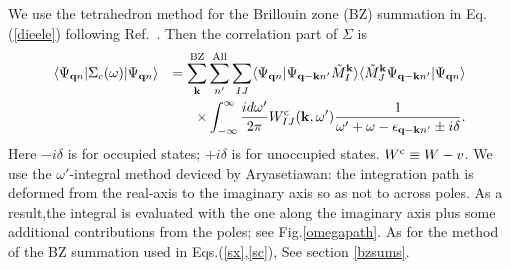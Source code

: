 \documentclass[a4paper,10pt,epsf,fleqn]{article}
\begin{document}
We use the tetrahedron method for the Brillouin zone (BZ) summation in Eq.(\ref{dieele})
following Ref.~\cite{rath75}.
Then the correlation part of $\Sigma$ is
\begin{eqnarray}
\langle \Psi_{{\bf q}n}|\Sigma_{\rm c}(\omega) |\Psi_{{\bf q}n} \rangle
&& = \sum^{\rm BZ}_{\bf k}  \sum^{\rm  All}_{n'} \sum_{IJ}
\langle \Psi_{{\bf q}n}| \Psi_{{\bf q-k}n'} \tilde{M}^{\bf k}_I \rangle
\langle \tilde{M}^{\bf k}_J \Psi_{{\bf q-k}n'} | \Psi_{{\bf q}n} \rangle  \nonumber \\
&& \times \int_{-\infty}^{\infty} \frac{i d\omega'}{2 \pi}
W^{\rm c}_{IJ}({\bf k},\omega')
\frac{1}{\omega'+\omega-\epsilon_{{\bf q-k}n'} \pm i \delta}. \label{sc}
\end{eqnarray}
Here $-i \delta$ is for occupied states; $+i \delta$ is for unoccupied
states.  $W^{\rm c} \equiv W - v$. We use the $\omega'$-integral method 
deviced by Aryasetiawan\cite{aryasetiawanasa1}: the integration path is deformed from
the real-axis to the imaginary axis so as not to across poles.
As a result,the integral is evaluated with the one along the imaginary axis plus
some additional contributions from the poles; see Fig.\ref{omegapath}.  
As for the method of the BZ summation used in Eqs.(\ref{sx},\ref{sc}), 
See section \ref{bzsums}.
\end{document}
